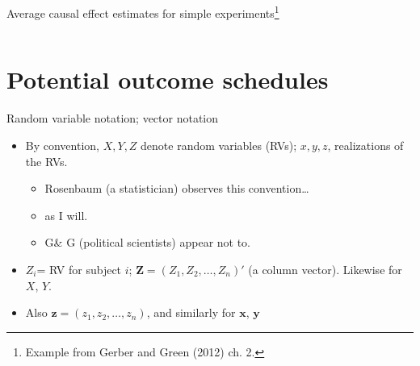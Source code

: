 \begin{frame}{Average causal effect estimates for simple
    experiments\footnote{Example from Gerber and Green (2012) ch. 2.}}


  \begin{columns}
    \begin{Column}
    \end{Column}
    \begin{Column}
      
    \end{Column}
  \end{columns}

  
\end{frame}

\section{Potential outcome schedules}

\begin{frame}{Random variable notation; vector notation}
  
  \begin{itemize}
  \item By convention, $X, Y, Z$ denote random variables (RVs); $x, y, z$, realizations of the RVs.
    \begin{itemize}
    \item Rosenbaum (a statistician) observes this convention\ldots
    \item as I will.
    \item G\& G (political scientists) appear not to.
    \end{itemize}
  \item $Z_i$= RV for subject $i$; $\mathbf{Z}=(Z_1, Z_2, \ldots, Z_n)'$ (a column vector).  Likewise for $X$, $Y$.
  \item Also $\mathbf{z}=(z_1, z_2, \ldots, z_n)$, and similarly for $\mathbf{x}$, $\mathbf{y}$
  \end{itemize}


\end{frame}

